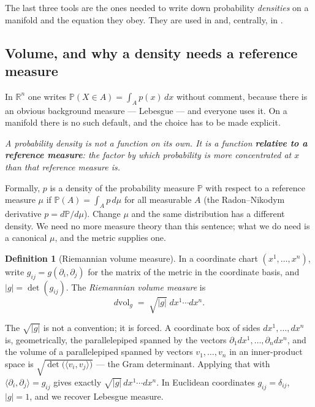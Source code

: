 \documentclass[11pt,a4paper]{report}
\theoremstyle{definition}
\newtheorem{definition}[definition]{Definition}
\theoremstyle{remark}
\newcommand{\RR}{\mathbb R}
\newcommand{\PP}{\mathbb P}
\begin{document}
The last three tools are the ones needed to write down probability
\emph{densities} on a manifold and the equation they obey. They are used in
 and, centrally, in .

\subsection{Volume, and why a density needs a reference measure}
\label{sec:riemannian-volume}

In $\RR^n$ one writes $\PP(X\in A)=\int_Ap(x)\,dx$ without comment, because
there is an obvious background measure --- Lebesgue --- and everyone uses it.
On a manifold there is no such default, and the choice has to be made
explicit.

\begin{center}
\emph{A probability density is not a function on its own. It is a function
\textbf{relative to a reference measure}: the factor by which probability is
more concentrated at $x$ than that reference measure is.}
\end{center}

Formally, $p$ is a density of the probability measure $\PP$ with respect to
a reference measure $\mu$ if $\PP(A)=\int_Ap\,d\mu$ for all measurable $A$
(the Radon--Nikodym derivative $p=d\PP/d\mu$). Change $\mu$ and the same
distribution has a different density. We need no more measure theory than
this sentence; what we do need is a canonical $\mu$, and the metric supplies
one.

\begin{definition}[Riemannian volume measure]
\label{def:riemannian-volume}
In a coordinate chart $(x^1,\dots,x^n)$, write $g_{ij}=g(\partial_i,\partial_j)$
for the matrix of the metric in the coordinate basis, and $|g|=\det(g_{ij})$.
The \emph{Riemannian volume measure} is
\[
d\mathrm{vol}_g \;=\; \sqrt{|g|}\;dx^1\cdots dx^n .
\]
\end{definition}

The $\sqrt{|g|}$ is not a convention; it is forced. A coordinate box of
sides $dx^1,\dots,dx^n$ is, geometrically, the parallelepiped spanned by the
vectors $\partial_1dx^1,\dots,\partial_ndx^n$, and the volume of a
parallelepiped spanned by vectors $v_1,\dots,v_n$ in an inner-product space
is $\sqrt{\det\bigl(\langle v_i,v_j\rangle\bigr)}$ --- the Gram determinant.
Applying that with $\langle\partial_i,\partial_j\rangle=g_{ij}$ gives exactly
$\sqrt{|g|}\,dx^1\cdots dx^n$. In Euclidean coordinates $g_{ij}=\delta_{ij}$,
$|g|=1$, and we recover Lebesgue measure.
\end{document}
